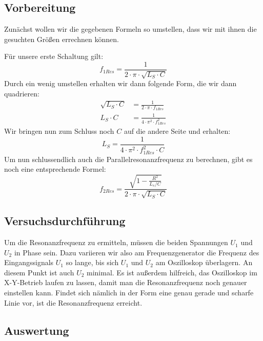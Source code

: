 \documentclass{article}
\begin{document}
\subsection{Vorbereitung}
\begin{figure}

\end{figure}
Zunächst wollen wir die gegebenen Formeln so umstellen, dass wir mit ihnen die gesuchten Größen errechnen können.

Für unsere erste Schaltung gilt:
\begin{equation}
  f_{1Res} = \frac{1}{2\cdot \pi \cdot \sqrt{L_S \cdot C}}
\end{equation}
Durch ein wenig umstellen erhalten wir dann folgende Form, die wir dann quadrieren:
\begin{align*}
  \sqrt{L_S\cdot C} & = \frac{1}{2\cdot\pi \cdot f_{1Res}}    \\
  L_S \cdot C       & = \frac{1}{4\cdot\pi^2\cdot f_{1Res}^2}
\end{align*}
Wir bringen nun zum Schluss noch $C$ auf die andere Seite und erhalten:
\begin{equation}\label{eq:LS}
  L_S = \frac{1}{4\cdot\pi^2\cdot f_{1Res}^2\cdot C}
\end{equation}
Um nun schlussendlich auch die Parallelresonanzfrequenz zu berechnen, gibt es noch eine entsprechende Formel:
\begin{equation}\label{eq:f2}
  f_{2Res} = \frac{\sqrt{1-\frac{R^2}{L_s/C}}}{2\cdot\pi\cdot\sqrt{L_S\cdot C}}
\end{equation}
\subsection{Versuchsdurchführung}
Um die Resonanzfrequenz zu ermitteln, müssen die beiden Spannungen $U_1$ und $U_2$ in Phase sein.
Dazu variieren wir also am Frequenzgenerator die Frequenz des Eingangssignals $U_1$ so lange, bis sich
$U_1$ und $U_2$ am Oszilloskop überlagern. An diesem Punkt ist auch $U_2$ minimal.
Es ist außerdem hilfreich, das Oszilloskop im X-Y-Betrieb laufen zu lassen, damit man die Resonanzfrequenz noch genauer einstellen kann.
Findet sich nämlich in der Form eine genau gerade und scharfe Linie vor, ist die Resonanzfrequenz erreicht.

\subsection{Auswertung}
\end{document}
